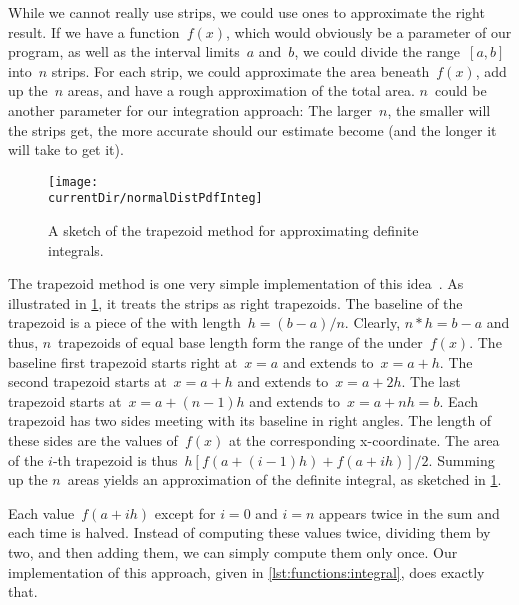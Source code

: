 While we cannot really use  strips, we could use  ones to approximate the right result.
If we have a function~$f(x)$, which would obviously be a parameter of our program, as well as the interval limits~$a$ and~$b$, we could divide the range~$[a,b]$ into~$n$ strips.
For each strip, we could approximate the area beneath~$f(x)$, add up the~$n$ areas, and have a rough approximation of the total area.
$n$~could be another parameter for our integration approach:
The larger~$n$, the smaller will the strips get, the more accurate should our estimate become (and the longer it will take to get it).%
%
\begin{figure}%
\centering%
\texttt{[image: \\currentDir/normalDistPdfInteg]}%
\caption{A sketch of the trapezoid method for approximating definite integrals.}%
\label{fig:normalDistPdfInteg}%
\end{figure}%
%
%
%

The trapezoid method is one very simple implementation of this idea~\cite{E2013AITNMAA}.
As illustrated in \cref{fig:normalDistPdfInteg}, it treats the strips as right trapezoids.
The baseline of the trapezoid is a piece of the  with length~$h=(b-a)/n$.
Clearly, $n*h=b-a$ and thus, $n$~trapezoids of equal base length form the range of the  under~$f(x)$.
The baseline first trapezoid starts right at~$x=a$ and extends to~$x=a+h$.
The second trapezoid starts at~$x=a+h$ and extends to~$x=a+2h$.
The last trapezoid starts at~$x=a+(n-1)h$ and extends to~$x=a+nh=b$.
Each trapezoid has two sides meeting with its baseline in right angles.
The length of these sides are the values of~$f(x)$ at the corresponding x\nobreakdashes-coordinate.
The area of the $i$\nobreakdashes-th trapezoid is thus~$h[f(a+(i-1)h)+f(a+ih)]/2$.
Summing up the $n$~areas yields an approximation of the definite integral, as sketched in \cref{fig:normalDistPdfInteg}.

Each value~$f(a+ih)$ except for $i=0$ and $i=n$ appears twice in the sum and each time is halved.
Instead of computing these values twice, dividing them by two, and then adding them, we can simply compute them only once.
Our implementation  of this approach, given in \cref{lst:functions:integral}, does exactly that.

